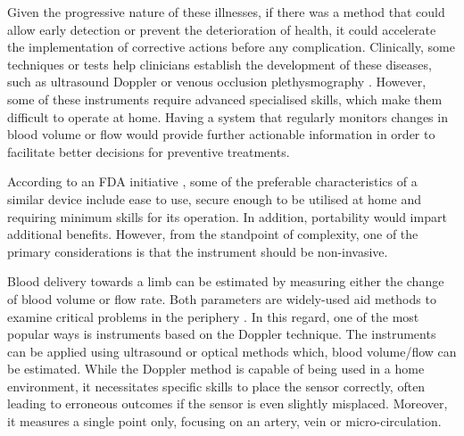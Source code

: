 Given the progressive nature of these illnesses, if there was a method that could allow early detection or prevent the deterioration of health, it could accelerate the implementation of corrective actions before any complication. Clinically, some techniques or tests help clinicians establish the development of these diseases, such as ultrasound Doppler \cite{casey2008measuring} or venous occlusion plethysmography \cite{wilkinson2001venous}. However, some of these instruments require advanced specialised skills, which make them difficult to operate at home. Having a system that regularly monitors changes in blood volume or flow would provide further actionable information in order to facilitate better decisions for preventive treatments. 

According to an FDA initiative \cite{fdaini}, some of the preferable characteristics of a similar device include ease to use, secure enough to be utilised at home and requiring minimum skills for its operation. In addition, portability would impart additional benefits. However, from the standpoint of complexity, one of the primary considerations is that the instrument should be non-invasive. 

Blood delivery towards a limb can be estimated by measuring either the change of blood volume or flow rate. Both parameters are widely-used aid methods to examine critical problems in the periphery \cite{orchard1993assessment, hirsch2001peripheral}. In this regard, one of the most popular ways is instruments based on the Doppler technique. The instruments can be applied using ultrasound \cite{orekhova2013doppler} or optical \cite{fredriksson2007laser} methods which, blood volume/flow can be estimated. While the Doppler method is capable of being used in a home environment, it necessitates specific skills to place the sensor correctly, often leading to erroneous outcomes if the sensor is even slightly misplaced. Moreover, it measures a single point only, focusing on an artery, vein or micro-circulation. 

